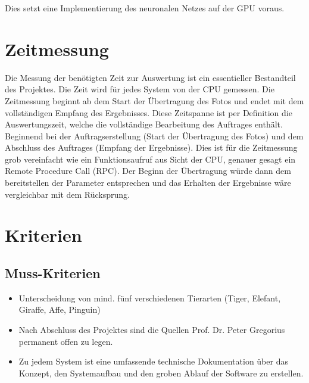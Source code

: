 Dies setzt eine Implementierung des neuronalen Netzes auf der GPU voraus.  


\section*{\LARGE\textbf{Zeitmessung}}

Die Messung der benötigten Zeit zur Auswertung ist ein essentieller Bestandteil des Projektes. Die Zeit wird für jedes System von der CPU gemessen. Die Zeitmessung beginnt ab dem Start der Übertragung des Fotos und endet mit dem vollständigen Empfang des Ergebnisses. Diese Zeitspanne ist per Definition die Auswertungszeit, welche die vollständige Bearbeitung des Auftrages enthält. Beginnend bei der Auftragserstellung (Start der Übertragung des Fotos) und dem Abschluss des Auftrages (Empfang der Ergebnisse). Dies ist für die Zeitmessung grob vereinfacht wie ein Funktionsaufruf aus Sicht der CPU,  genauer gesagt ein Remote Procedure Call (RPC). Der Beginn der Übertragung würde dann dem bereitstellen der Parameter entsprechen und das Erhalten der Ergebnisse wäre vergleichbar mit dem Rücksprung.

\newpage


\section*{\LARGE\textbf{Kriterien}}

\vspace{0.8cm}


\subsection*{\Large\textbf{Muss-Kriterien}}

\vspace{0.5cm}

\begin{itemize}
	\item Unterscheidung von mind. fünf verschiedenen Tierarten (Tiger, Elefant, Giraffe, Affe, Pinguin)
	\item Nach Abschluss des Projektes sind die Quellen Prof. Dr. Peter Gregorius permanent offen zu legen.
	\item Zu jedem System ist eine umfassende technische Dokumentation über das Konzept, den Systemaufbau und den groben Ablauf der Software zu erstellen.
\end{itemize}

